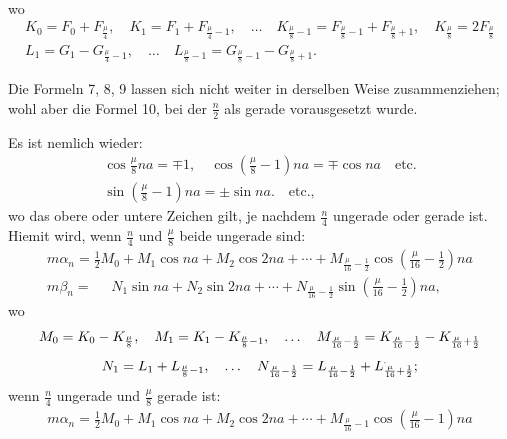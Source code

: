 \begin{landscape}
\[\begin{array}{l}
\end{array}
\]
wo
\[
\begin{gathered}
K_0 = F_0 + F_{\frac{\mu}{4}}, \quad K_1 = F_1 + F_{\frac{\mu}{4}-1}, \quad \ldots \quad K_{\frac{\mu}{8}-1} = F_{\frac{\mu}{8}-1} + F_{\frac{\mu}{8}+1}, \quad K_{\frac{\mu}{8}} = 2F_{\frac{\mu}{8}}\\[4pt]
L_1 = G_1 - G_{\frac{\mu}{4}-1}, \quad \ldots \quad L_{\frac{\mu}{8}-1} = G_{\frac{\mu}{8}-1} - G_{\frac{\mu}{8}+1}.
\end{gathered}
\]
\par\noindent\hspace*{\parindent}Die Formeln 7, 8, 9 lassen sich nicht weiter in derselben Weise zusammenziehen; wohl aber die Formel 10, bei der \(\frac{n}{2}\) als gerade vorausgesetzt wurde.
\par\noindent\hspace*{\parindent}Es ist nemlich
wieder:
\[
\begin{gathered}
\cos\frac{\mu}{8}na = \mp 1, \quad \cos\left(\frac{\mu}{8}-1\right)na = \mp\cos na \quad \text{etc.}\\[4pt]
\sin\left(\frac{\mu}{8}-1\right)na = \pm\sin na\mathord{.}\quad \text{etc.,}
\end{gathered}
\]
wo das obere oder untere Zeichen gilt, je nachdem \(\frac{n}{4}\) ungerade oder gerade ist. Hiemit
wird, wenn \(\frac{n}{4}\)
und \(\frac{\mu}{8}\) beide ungerade sind:
\[
\tag*{11)}
\begin{array}{l}
m\alpha_n = \tfrac{1}{2}M_0 + M_1\cos na + M_2\cos 2na + \cdots + M_{\frac{\mu}{16}-\frac{1}{2}}\cos\left(\frac{\mu}{16}-\frac{1}{2}\right)na \\[4pt]
m\beta_n = \phantom{{}={}} N_1\sin na + N_2\sin 2na + \cdots + N_{\frac{\mu}{16}-\frac{1}{2}}\sin\left(\frac{\mu}{16}-\frac{1}{2}\right)na,
\end{array}
\]
wo
\[
\begin{gathered}
M_0 = K_0 - K_{\frac{\mu}{8}}, \quad M_1 = K_1 - K_{\frac{\mu}{8}-1}, \quad \ldots \quad M_{\frac{\mu}{16}-\frac{1}{2}} = K_{\frac{\mu}{16}-\frac{1}{2}} - K_{\frac{\mu}{16}+\frac{1}{2}}\\[4pt]
N_1 = L_1 + L_{\frac{\mu}{8}-1}, \quad \ldots \quad N_{\frac{\mu}{16}-\frac{1}{2}} = L_{\frac{\mu}{16}-\frac{1}{2}} + \VtwoMarkedL_{\frac{\mu}{16}+\frac{1}{2}};
\end{gathered}
\]
wenn \(\frac{n}{4}\) ungerade und \(\frac{\mu}{8}\) gerade ist:
\[
\tag*{12)}
\begin{array}{l}
m\alpha_n = \tfrac{1}{2}M_0 + M_1\cos na + M_2\cos 2na + \cdots + M_{\frac{\mu}{16}-1}\cos\left(\frac{\mu}{16}-1\right)na \\[4pt]

\end{array}\]
\end{landscape}
